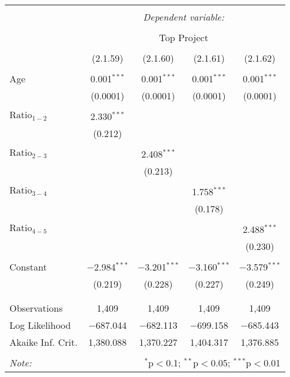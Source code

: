 
\begin{tabular}{@{\extracolsep{5pt}}lcccc}
\\[-1.8ex]\hline
\hline \\[-1.8ex]
 & \multicolumn{4}{c}{\textit{Dependent variable:}} \\
\cline{2-5}
\\[-1.8ex] & \multicolumn{4}{c}{Top Project} \\
\\[-1.8ex] & (2.1.59) & (2.1.60) & (2.1.61) & (2.1.62)\\ 
\hline \\[-1.8ex]
 Age & 0.001$^{***}$ & 0.001$^{***}$ & 0.001$^{***}$ & 0.001$^{***}$ \\
  & (0.0001) & (0.0001) & (0.0001) & (0.0001) \\
  & & & & \\
 $\text{Ratio}_{1-2}$ & 2.330$^{***}$ &  &  &  \\
  & (0.212) &  &  &  \\
  & & & & \\
 $\text{Ratio}_{2-3}$ &  & 2.408$^{***}$ &  &  \\
  &  & (0.213) &  &  \\
  & & & & \\
 $\text{Ratio}_{3-4}$ &  &  & 1.758$^{***}$ &  \\
  &  &  & (0.178) &  \\
  & & & & \\
 $\text{Ratio}_{4-5}$ &  &  &  & 2.488$^{***}$ \\
  &  &  &  & (0.230) \\
  & & & & \\
 Constant & $-$2.984$^{***}$ & $-$3.201$^{***}$ & $-$3.160$^{***}$ & $-$3.579$^{***}$ \\
  & (0.219) & (0.228) & (0.227) & (0.249) \\
  & & & & \\
\hline \\[-1.8ex]
Observations & 1,409 & 1,409 & 1,409 & 1,409 \\
Log Likelihood & $-$687.044 & $-$682.113 & $-$699.158 & $-$685.443 \\
Akaike Inf. Crit. & 1,380.088 & 1,370.227 & 1,404.317 & 1,376.885 \\
\hline
\hline \\[-1.8ex]
\textit{Note:}  & \multicolumn{4}{r}{$^{*}$p$<$0.1; $^{**}$p$<$0.05; $^{***}$p$<$0.01} \\
\end{tabular}
